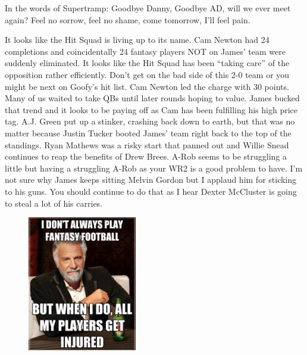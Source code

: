 \documentclass[11pt,letterpaper]{article}
\begin{document}
\newpage
{}
In the words of Supertramp: Goodbye Danny, Goodbye AD, will we ever meet again? Feel no sorrow, feel no shame, come tomorrow, I'll feel pain.

\par\noindent It looks like the Hit Squad is living up to its name. Cam Newton had 24 completions and coincidentally 24 fantasy players NOT on James' team were suddenly eliminated. It looks like the Hit Squad has been ``taking care'' of the opposition rather efficiently. Don't get on the bad side of this 2-0 team or you might be next on Goofy's hit list. Cam Newton led the charge with 30 points. Many of us waited to take QBs until later rounds hoping to value. James bucked that trend and it looks to be paying off as Cam has been fulfilling his high price tag. A.J. Green put up a stinker, crashing back down to earth, but that was no matter because Justin Tucker booted James' team right back to the top of the standings. Ryan Mathews was a risky start that panned out and Willie Snead continues to reap the benefits of Drew Brees. A-Rob seems to be struggling a little but having a struggling A-Rob as your WR2 is a good problem to have. I'm not sure why James keeps sitting Melvin Gordon but I applaud him for sticking to his guns. You should continue to do that as I hear Dexter McCluster is going to steal a lot of his carries.
\begin{figure}
\centering
\includegraphics[width=0.425\textwidth]{week2-injuries.png}
\label{fig:week2-injuries}
\end{figure} 
\bigskip
\end{document}
